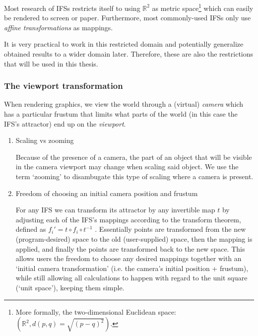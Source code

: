 \documentclass[11pt]{article}
\begin{document}

Most research of IFSs restricts itself to using \(\mathbb{R}^2\) as metric space\footnote{More formally, the two-dimensional Euclidean space: \(\left(\mathbb{R}^2, d(p, q) = \sqrt{(p - q)^2}\right)\).} which can easily be rendered to screen or paper.
Furthermore, most commonly-used IFSs only use \emph{affine transformations} as mappings.

It is very practical to work in this restricted domain 
and potentially generalize obtained results to a wider domain later.
Therefore, these are also the restrictions that will be used in this thesis.

\subsubsection{The viewport transformation}
\label{sec:org12f59c1}
\label{subsection:viewport_transformation}

When rendering graphics, we view the world through a (virtual) \emph{camera} which has a particular frustum 
that limits what parts of the world (in this case the IFS's attractor) end up on the \emph{viewport}.

\begin{enumerate}
\item Scaling vs zooming
\label{sec:orge7d4493}

Because of the presence of a camera, the part of an object that will be visible in the camera viewport may change when scaling said object.
We use the term `zooming' to disambugate this type of scaling where a camera is present.

\item Freedom of choosing an initial camera position and frustum
\label{sec:orge0ae8ed}

For any IFS we can transform its attractor by any invertible map \(t\) by adjusting each of the IFS's mappings according to the
transform theorem, defined as \(f_i' = t \circ f_i \circ t^{-1}\) \cite{barnsley1988fractals}. 
Essentially points are transformed from the new (program-desired) space to the old (user-supplied) space, then the mapping is applied, and finally the points are transformed back to the new space.
This allows users the freedom to choose any desired mappings together with an `initial camera transformation' (i.e. the camera's initial position + frustum),
while still allowing all calculations to happen with regard to the unit square (`unit space'), keeping them simple.
\end{enumerate}
\end{document}
